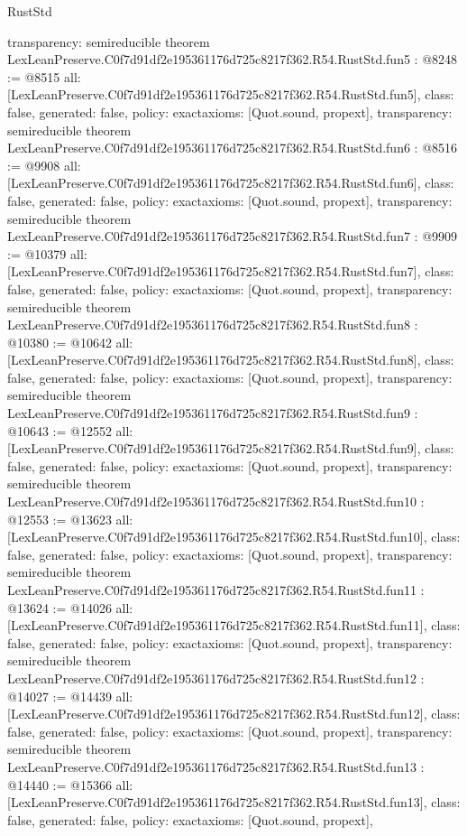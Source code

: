 \begin{lexlean}{RustStd}
\begin{coremodule}
{  transparency: semireducible
}
theorem LexLeanPreserve.C0f7d91df2e195361176d725c8217f362.R54.RustStd.fun5 : @8248 := @8515 {
  all: [LexLeanPreserve.C0f7d91df2e195361176d725c8217f362.R54.RustStd.fun5],
  class: false,
  generated: false,
  policy: exact{axioms: [Quot.sound, propext]},
  transparency: semireducible
}
theorem LexLeanPreserve.C0f7d91df2e195361176d725c8217f362.R54.RustStd.fun6 : @8516 := @9908 {
  all: [LexLeanPreserve.C0f7d91df2e195361176d725c8217f362.R54.RustStd.fun6],
  class: false,
  generated: false,
  policy: exact{axioms: [Quot.sound, propext]},
  transparency: semireducible
}
theorem LexLeanPreserve.C0f7d91df2e195361176d725c8217f362.R54.RustStd.fun7 : @9909 := @10379 {
  all: [LexLeanPreserve.C0f7d91df2e195361176d725c8217f362.R54.RustStd.fun7],
  class: false,
  generated: false,
  policy: exact{axioms: [Quot.sound, propext]},
  transparency: semireducible
}
theorem LexLeanPreserve.C0f7d91df2e195361176d725c8217f362.R54.RustStd.fun8 : @10380 := @10642 {
  all: [LexLeanPreserve.C0f7d91df2e195361176d725c8217f362.R54.RustStd.fun8],
  class: false,
  generated: false,
  policy: exact{axioms: [Quot.sound, propext]},
  transparency: semireducible
}
theorem LexLeanPreserve.C0f7d91df2e195361176d725c8217f362.R54.RustStd.fun9 : @10643 := @12552 {
  all: [LexLeanPreserve.C0f7d91df2e195361176d725c8217f362.R54.RustStd.fun9],
  class: false,
  generated: false,
  policy: exact{axioms: [Quot.sound, propext]},
  transparency: semireducible
}
theorem LexLeanPreserve.C0f7d91df2e195361176d725c8217f362.R54.RustStd.fun10 : @12553 := @13623 {
  all: [LexLeanPreserve.C0f7d91df2e195361176d725c8217f362.R54.RustStd.fun10],
  class: false,
  generated: false,
  policy: exact{axioms: [Quot.sound, propext]},
  transparency: semireducible
}
theorem LexLeanPreserve.C0f7d91df2e195361176d725c8217f362.R54.RustStd.fun11 : @13624 := @14026 {
  all: [LexLeanPreserve.C0f7d91df2e195361176d725c8217f362.R54.RustStd.fun11],
  class: false,
  generated: false,
  policy: exact{axioms: [Quot.sound, propext]},
  transparency: semireducible
}
theorem LexLeanPreserve.C0f7d91df2e195361176d725c8217f362.R54.RustStd.fun12 : @14027 := @14439 {
  all: [LexLeanPreserve.C0f7d91df2e195361176d725c8217f362.R54.RustStd.fun12],
  class: false,
  generated: false,
  policy: exact{axioms: [Quot.sound, propext]},
  transparency: semireducible
}
theorem LexLeanPreserve.C0f7d91df2e195361176d725c8217f362.R54.RustStd.fun13 : @14440 := @15366 {
  all: [LexLeanPreserve.C0f7d91df2e195361176d725c8217f362.R54.RustStd.fun13],
  class: false,
  generated: false,
  policy: exact{axioms: [Quot.sound, propext]},
}
\end{coremodule}
\end{lexlean}
